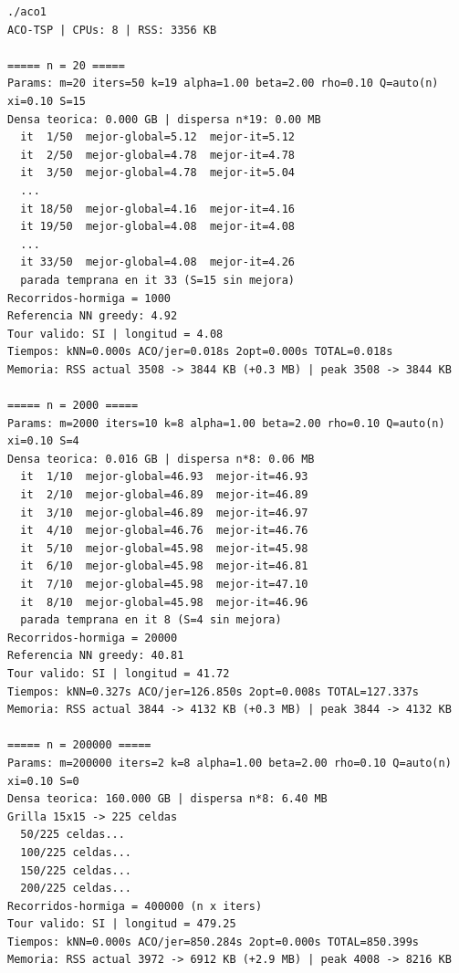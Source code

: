 \documentclass[11pt,a4paper]{article}
\begin{document}
\begin{lstlisting}
./aco1             
ACO-TSP | CPUs: 8 | RSS: 3356 KB

===== n = 20 =====
Params: m=20 iters=50 k=19 alpha=1.00 beta=2.00 rho=0.10 Q=auto(n) xi=0.10 S=15
Densa teorica: 0.000 GB | dispersa n*19: 0.00 MB
  it  1/50  mejor-global=5.12  mejor-it=5.12
  it  2/50  mejor-global=4.78  mejor-it=4.78
  it  3/50  mejor-global=4.78  mejor-it=5.04
  ...
  it 18/50  mejor-global=4.16  mejor-it=4.16
  it 19/50  mejor-global=4.08  mejor-it=4.08
  ...
  it 33/50  mejor-global=4.08  mejor-it=4.26
  parada temprana en it 33 (S=15 sin mejora)
Recorridos-hormiga = 1000
Referencia NN greedy: 4.92
Tour valido: SI | longitud = 4.08
Tiempos: kNN=0.000s ACO/jer=0.018s 2opt=0.000s TOTAL=0.018s
Memoria: RSS actual 3508 -> 3844 KB (+0.3 MB) | peak 3508 -> 3844 KB

===== n = 2000 =====
Params: m=2000 iters=10 k=8 alpha=1.00 beta=2.00 rho=0.10 Q=auto(n) xi=0.10 S=4
Densa teorica: 0.016 GB | dispersa n*8: 0.06 MB
  it  1/10  mejor-global=46.93  mejor-it=46.93
  it  2/10  mejor-global=46.89  mejor-it=46.89
  it  3/10  mejor-global=46.89  mejor-it=46.97
  it  4/10  mejor-global=46.76  mejor-it=46.76
  it  5/10  mejor-global=45.98  mejor-it=45.98
  it  6/10  mejor-global=45.98  mejor-it=46.81
  it  7/10  mejor-global=45.98  mejor-it=47.10
  it  8/10  mejor-global=45.98  mejor-it=46.96
  parada temprana en it 8 (S=4 sin mejora)
Recorridos-hormiga = 20000
Referencia NN greedy: 40.81
Tour valido: SI | longitud = 41.72
Tiempos: kNN=0.327s ACO/jer=126.850s 2opt=0.008s TOTAL=127.337s
Memoria: RSS actual 3844 -> 4132 KB (+0.3 MB) | peak 3844 -> 4132 KB

===== n = 200000 =====
Params: m=200000 iters=2 k=8 alpha=1.00 beta=2.00 rho=0.10 Q=auto(n) xi=0.10 S=0
Densa teorica: 160.000 GB | dispersa n*8: 6.40 MB
Grilla 15x15 -> 225 celdas
  50/225 celdas...
  100/225 celdas...
  150/225 celdas...
  200/225 celdas...
Recorridos-hormiga = 400000 (n x iters)
Tour valido: SI | longitud = 479.25
Tiempos: kNN=0.000s ACO/jer=850.284s 2opt=0.000s TOTAL=850.399s
Memoria: RSS actual 3972 -> 6912 KB (+2.9 MB) | peak 4008 -> 8216 KB
\end{lstlisting}
\end{document}
